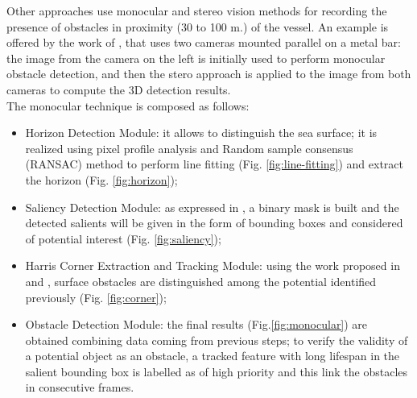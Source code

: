 \documentclass[12pt]{article}
\begin{document}
      \indent Other approaches use monocular and stereo vision methods for recording the presence of obstacles in proximity (30 to 100 m.) of the vessel. An example is offered by the work of \textcite{Wang2011,Wang2012}, that uses two cameras mounted parallel on a metal bar: the image from the camera on the left is initially used to perform monocular obstacle detection, and then the stero approach is applied to the image from both cameras to compute the 3D detection results.\\
      The monocular technique is composed as follows:
            \begin{itemize}
                  \item Horizon Detection Module: it allows to distinguish the sea surface; it is realized using pixel profile analysis and Random sample consensus (RANSAC) \parencite{Fischler1981} method to perform line fitting (Fig. \ref{fig:line-fitting}) and extract the horizon (Fig. \ref{fig:horizon});
                  \item Saliency Detection Module: as expressed in \parencite{Achanta2009}, a binary mask is built and the detected salients will be given in the form of bounding boxes and considered of potential interest (Fig. \ref{fig:saliency});
                  \item Harris Corner Extraction and Tracking Module: using the work proposed in \parencite{Harris1988} and \parencite{Bouguet1999}, surface obstacles are distinguished among the potential identified previously (Fig. \ref{fig:corner});
                  \item Obstacle Detection Module: the final results (Fig.\ref{fig:monocular}) are obtained combining data coming from previous steps; to verify the validity of a potential object as an obstacle, a tracked feature with long lifespan in the salient bounding box is labelled as of high priority and this link the obstacles in consecutive frames.
            \end{itemize}
\end{document}
